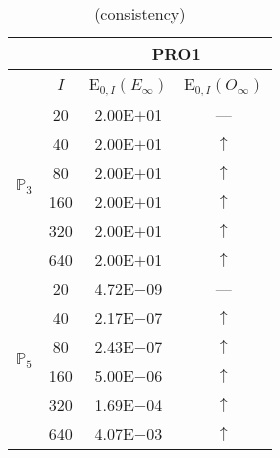 \begin{table}[H]
\caption{(consistency)}
\setlength{\tabcolsep}{5pt}
\centering
\begin{tabular}{@{}l c c c@{}}
\toprule
 &  & \multicolumn{2}{c}{PRO1}\\
\midrule
 & $I$ & E$_{0,I}(E_{\infty})$ & E$_{0,I}(O_{\infty})$\\
\midrule
\multirow{6}{*}{$\mathbb{P}_{3}$}
 & 20 & 2.00E$+$01 & ---\\
 & 40 & 2.00E$+$01 & $\uparrow$\\
 & 80 & 2.00E$+$01 & $\uparrow$\\
 & 160 & 2.00E$+$01 & $\uparrow$\\
 & 320 & 2.00E$+$01 & $\uparrow$\\
 & 640 & 2.00E$+$01 & $\uparrow$\\
\midrule
\multirow{6}{*}{$\mathbb{P}_{5}$}
 & 20 & 4.72E$-$09 & ---\\
 & 40 & 2.17E$-$07 & $\uparrow$\\
 & 80 & 2.43E$-$07 & $\uparrow$\\
 & 160 & 5.00E$-$06 & $\uparrow$\\
 & 320 & 1.69E$-$04 & $\uparrow$\\
 & 640 & 4.07E$-$03 & $\uparrow$\\
\bottomrule
\end{tabular}
\label{Table:PRO:test_01_01_test48_pro1}
\end{table}

